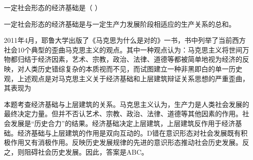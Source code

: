 \question 一定社会形态的经济基础是（ ）
\par{}
\begin{solution}一定社会形态的经济基础是与一定生产力发展阶段相适应的生产关系的总和。
\end{solution}
\question 2011年4月，耶鲁大学出版了《马克思为什么是对的》一书，书中列举了当前西方社会10个典型的歪曲马克思主义的观点。其中一种观点认为：马克思主义将世间万物都归结于经济因素，艺术、宗教，政治、法律、道德等都被简单地视为经济的反映，对人类历史错综复杂的本质视而不见，而试图建立一种非黑即白的单一历史观，上述观点是对马克思主义关于经济基础和上层建筑辩证关系思想的严重歪曲，其表现为
\par{}
\begin{solution}本题考查经济基础与上层建筑的关系。马克思主义认为，生产力是人类社会发展的最终决定力量。但并不否认艺术、宗教、政治、法律、道德等其他因素的作用。社会发展是``历史合力''的结果。经济基础决定上层建筑，上层建筑反作用于经济基础。经济基础与上层建筑的作用是双向互动的。D错在意识形态对社会发展既有积极作用又有消极作用。反映历史发展规律的先进的意识形态推动社会历史发展。反之，则阻碍社会历史发展。因此，答案是ABC。
\end{solution}
